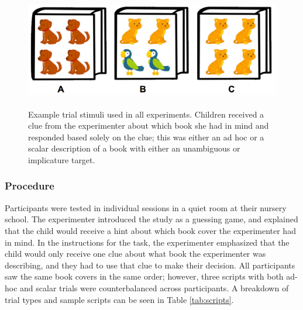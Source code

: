 \documentclass[man]{apa2}
\begin{document}
\begin{figure}
 \begin{center} 
  \includegraphics[height=2in]{figures/implicatures_demo_letters.png} 
  \caption{\label{fig:demo} Example trial stimuli used in all experiments. Children received a clue from the experimenter about which book she had in mind and responded based solely on the clue; this was either an ad hoc or a scalar description of a book with either an unambiguous or implicature target.} 
 \end{center} 
\end{figure}	


\subsubsection{Procedure}
Participants were tested in individual sessions in a quiet room at their nursery school. The experimenter introduced the study as a guessing game, and explained that the child would receive a hint about which book cover the experimenter had in mind. In the instructions for the task, the experimenter emphasized that the child would only receive one clue about what book the experimenter was describing, and they had to use that clue to make their decision. All participants saw the same book covers in the same order; however, three scripts with both ad-hoc and scalar trials were counterbalanced across participants. A breakdown of trial types and sample scripts can be seen in Table \ref{tab:scripts}. 
\end{document}

